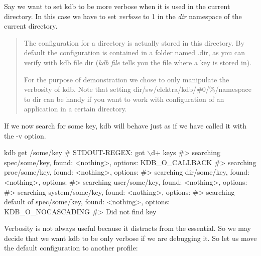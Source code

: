 Say we want to set {\ttfamily kdb} to be more verbose when it is used in the current directory. In this case we have to set {\itshape verbose} to 1 in the {\itshape dir} namespace of the current directory.




\begin{quote}
The configuration for a directory is actually stored in this directory. By default the configuration is contained in a folder named {\ttfamily .dir}, as you can verify with {\ttfamily kdb file dir} ({\itshape kdb file} tells you the file where a key is stored in).

For the purpose of demonstration we chose to only manipulate the verbosity of kdb. Note that setting {\ttfamily dir/sw/elektra/kdb/\#0/\%/namespace} to {\ttfamily dir} can be handy if you want to work with configuration of an application in a certain directory. \end{quote}


If we now search for some key, {\ttfamily kdb} will behave just as if we have called it with the {\ttfamily -\/v} option.


\begin{DoxyCode}
kdb get /some/key
# STDOUT-REGEX: got \(\backslash\)d+ keys
#> searching spec/some/key, found: <nothing>, options: KDB\_O\_CALLBACK
#>     searching proc/some/key, found: <nothing>, options:
#>     searching dir/some/key, found: <nothing>, options:
#>     searching user/some/key, found: <nothing>, options:
#>     searching system/some/key, found: <nothing>, options:
#>     searching default of spec/some/key, found: <nothing>, options: KDB\_O\_NOCASCADING
#> Did not find key
\end{DoxyCode}


Verbosity is not always useful because it distracts from the essential. So we may decide that we want {\ttfamily kdb} to be only verbose if we are debugging it. So let us move the default configuration to another profile\+:




